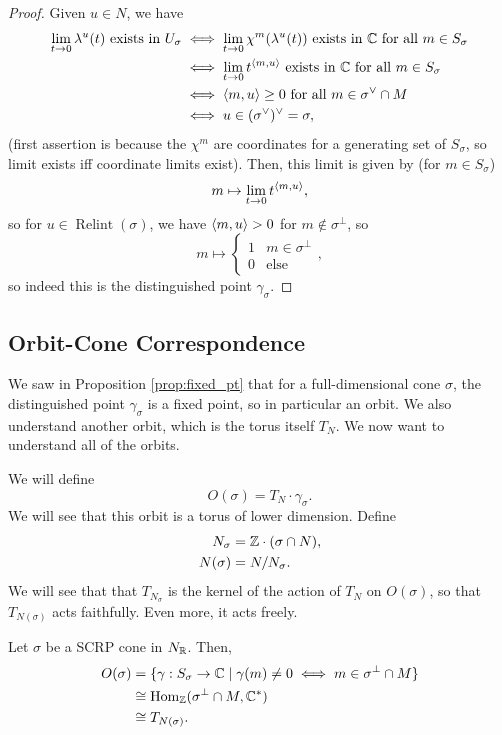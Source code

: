 \documentclass[12pt]{article}
\DeclareMathOperator{\Relint}{Relint}
\begin{document}
\begin{proof}
    Given $u\in N$, we have
    \begin{align*}
        \lim_{t\to 0} \lambda^u(t) \text{ exists in $U_\sigma$} &\iff \lim_{t\to 0} \chi^m(\lambda^u(t)) \text{ exists in $\mathbb{C}$ for all } m\in S_\sigma\\
        &\iff \lim_{t\to 0} t^{\left\langle m,u\right\rangle}  \text{ exists in $\mathbb{C}$ for all } m\in S_\sigma\\
        &\iff \left\langle m,u\right\rangle\geq 0  \text{ for all } m\in \sigma^\vee \cap M\\
        &\iff u\in (\sigma^\vee)^\vee=\sigma,
    \end{align*}
    (first assertion is because the $\chi^m$ are coordinates for a generating set of $S_\sigma$, so limit exists iff coordinate limits exist). Then, this limit is given by (for $m\in S_\sigma$)
    \[m\mapsto \lim_{t\to 0} t^{\left\langle m,u\right\rangle},\]
    so for $u\in \Relint(\sigma)$, we have $\left\langle m,u\right\rangle>0$ for $m\not\in \sigma^\perp$, so
    \[m\mapsto \begin{cases}
        1 & m\in \sigma^\perp\\
        0 & \text{else}
    \end{cases},\]
    so indeed this is the distinguished point $\gamma_\sigma$.
\end{proof}

\subsection{Orbit-Cone Correspondence}

We saw in Proposition \ref{prop:fixed_pt} that for a full-dimensional cone $\sigma$, the distinguished point $\gamma_\sigma$ is a fixed point, so in particular an orbit. We also understand another orbit, which is the torus itself $T_N$. We now want to understand all of the orbits.

We will define
\[O(\sigma) = T_N \cdot \gamma_\sigma.\]
We will see that this orbit is a torus of lower dimension. Define
\begin{align*}
    N_\sigma &= \mathbb{Z}\cdot(\sigma\cap N),\\
    N(\sigma) &= N/N_\sigma.
\end{align*}
We will see that that $T_{N_\sigma}$ is the kernel of the action of $T_N$ on $O(\sigma)$, so that $T_{N(\sigma)}$ acts faithfully. Even more, it acts freely.
\begin{lem}
    Let $\sigma$ be a SCRP cone in $N_{\mathbb{R}}$. Then,
    \begin{align*}
        O(\sigma) &= \{\gamma: S_\sigma \to \mathbb{C} \mid \gamma(m)\neq 0 \iff m\in \sigma^\perp \cap M\}\\
        &\cong \mathrm{Hom}_{\mathbb{Z}}(\sigma^\perp \cap M, \mathbb{C}^*)\\
        &\cong T_{N(\sigma)}.
    \end{align*}
\end{lem}
\end{document}

